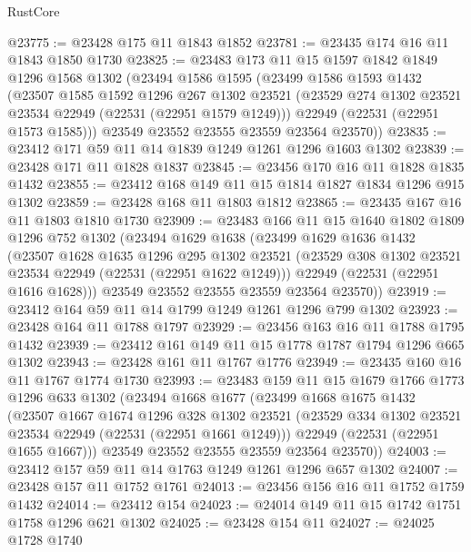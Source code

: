 \begin{lexlean}{RustCore}
\begin{coremodule}
@23775 := @23428 @175 @11 @1843 @1852
@23781 := @23435 @174 @16 @11 @1843 @1850 @1730
@23825 := @23483
    @173
    @11
    @15
    @1597
    @1842
    @1849
    @1296
    @1568
    @1302
    (@23494
      @1586
      @1595
      (@23499
        @1586
        @1593
        @1432
        (@23507
          @1585
          @1592
          @1296
          @267
          @1302
          @23521
          (@23529 @274 @1302 @23521 @23534 @22949 (@22531 (@22951 @1579 @1249)))
          @22949
          (@22531 (@22951 @1573 @1585)))
        @23549
        @23552
        @23555
        @23559
        @23564
        @23570))
@23835 := @23412 @171 @59 @11 @14 @1839 @1249 @1261 @1296 @1603 @1302
@23839 := @23428 @171 @11 @1828 @1837
@23845 := @23456 @170 @16 @11 @1828 @1835 @1432
@23855 := @23412 @168 @149 @11 @15 @1814 @1827 @1834 @1296 @915 @1302
@23859 := @23428 @168 @11 @1803 @1812
@23865 := @23435 @167 @16 @11 @1803 @1810 @1730
@23909 := @23483
    @166
    @11
    @15
    @1640
    @1802
    @1809
    @1296
    @752
    @1302
    (@23494
      @1629
      @1638
      (@23499
        @1629
        @1636
        @1432
        (@23507
          @1628
          @1635
          @1296
          @295
          @1302
          @23521
          (@23529 @308 @1302 @23521 @23534 @22949 (@22531 (@22951 @1622 @1249)))
          @22949
          (@22531 (@22951 @1616 @1628)))
        @23549
        @23552
        @23555
        @23559
        @23564
        @23570))
@23919 := @23412 @164 @59 @11 @14 @1799 @1249 @1261 @1296 @799 @1302
@23923 := @23428 @164 @11 @1788 @1797
@23929 := @23456 @163 @16 @11 @1788 @1795 @1432
@23939 := @23412 @161 @149 @11 @15 @1778 @1787 @1794 @1296 @665 @1302
@23943 := @23428 @161 @11 @1767 @1776
@23949 := @23435 @160 @16 @11 @1767 @1774 @1730
@23993 := @23483
    @159
    @11
    @15
    @1679
    @1766
    @1773
    @1296
    @633
    @1302
    (@23494
      @1668
      @1677
      (@23499
        @1668
        @1675
        @1432
        (@23507
          @1667
          @1674
          @1296
          @328
          @1302
          @23521
          (@23529 @334 @1302 @23521 @23534 @22949 (@22531 (@22951 @1661 @1249)))
          @22949
          (@22531 (@22951 @1655 @1667)))
        @23549
        @23552
        @23555
        @23559
        @23564
        @23570))
@24003 := @23412 @157 @59 @11 @14 @1763 @1249 @1261 @1296 @657 @1302
@24007 := @23428 @157 @11 @1752 @1761
@24013 := @23456 @156 @16 @11 @1752 @1759 @1432
@24014 := @23412 @154
@24023 := @24014 @149 @11 @15 @1742 @1751 @1758 @1296 @621 @1302
@24025 := @23428 @154 @11
@24027 := @24025 @1728 @1740

\end{coremodule}
\end{lexlean}
